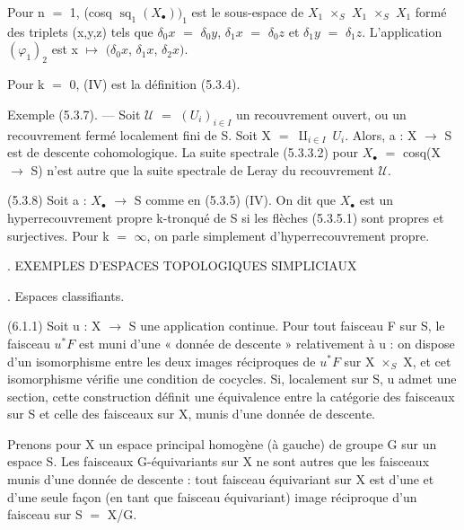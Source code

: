 \documentclass[11pt,twoside]{article}
\begin{document}
Pour n \(=\) 1, (cosq \(\operatorname{sq}_{1}(X_{\bullet }))_{1}\) est le sous-espace de \(X_{1}\) \(\times _{S}\) \(X_{1}\) \(\times _{S}\) \(X_{1}\) formé des triplets (x,y,z) tels que \(\delta _{0}x\) \(=\) \(\delta _{0}y\), \(\delta _{1}x\) \(=\) \(\delta _{0}z\) et \(\delta _{1}y\) \(=\) \(\delta _{1}z\). L’application \((\varphi _{1})_{2}\) est x \(↦\) \((\delta _{0}x\), \(\delta _{1}x\), \(\delta _{2}x)\).\par
\par\medskip
Pour k \(=\) 0, (IV) est la définition (5.3.4).\par
\par\medskip
Exemple (5.3.7). — Soit \(𝒰\) \(=\) \((U_{i})_{i\in I}\) un recouvrement ouvert, ou un recouvrement fermé localement fini de S. Soit X \(=\) \(⨿_{i\in I}\) \(U_{i}\). Alors, a : X \(\to \) S est de descente cohomologique. La suite spectrale (5.3.3.2) pour \(X_{\bullet }\) \(=\) cosq(X \(\to \) S) n’est autre que la suite spectrale de Leray du recouvrement \(𝒰\).\par
\par\medskip
(5.3.8) Soit a : \(X_{\bullet }\) \(\to \) S comme en (5.3.5) (IV). On dit que \(X_{\bullet }\) est un hyperrecouvrement propre k-tronqué de S si les flèches (5.3.5.1) sont propres et surjectives. Pour k \(=\) \(\infty \), on parle simplement d’hyperrecouvrement propre.\par
\par{}. EXEMPLES D’ESPACES TOPOLOGIQUES SIMPLICIAUX\par
\par{}. Espaces classifiants.\par
\par\medskip
(6.1.1) Soit u : X \(\to \) S une application continue. Pour tout faisceau F sur S, le faisceau \(u^{\ast }F\) est muni d’une « donnée de descente » relativement à u : on dispose d’un isomorphisme entre les deux images réciproques de \(u^{\ast }F\) sur X \(\times _{S}\) X, et cet isomorphisme vérifie une condition de cocycles. Si, localement sur S, u admet une section, cette construction définit une équivalence entre la catégorie des faisceaux sur S et celle des faisceaux sur X, munis d’une donnée de descente.\par
\par\medskip
Prenons pour X un espace principal homogène (à gauche) de groupe G sur un espace S. Les faisceaux G-équivariants sur X ne sont autres que les faisceaux munis d’une donnée de descente : tout faisceau équivariant sur X est d’une et d’une seule façon (en tant que faisceau équivariant) image réciproque d’un faisceau sur S \(=\) X/G.\par
\end{document}
